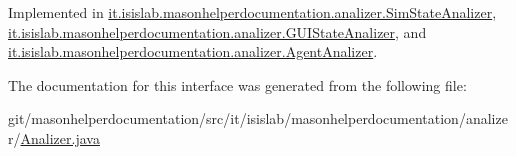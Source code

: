 Implemented in \hyperlink{classit_1_1isislab_1_1masonhelperdocumentation_1_1analizer_1_1_sim_state_analizer_aa91938db714ec7b05134139ce741e61d}{it.\-isislab.\-masonhelperdocumentation.\-analizer.\-Sim\-State\-Analizer}, \hyperlink{classit_1_1isislab_1_1masonhelperdocumentation_1_1analizer_1_1_g_u_i_state_analizer_ade3afe629883da877a73f0a2527c4826}{it.\-isislab.\-masonhelperdocumentation.\-analizer.\-G\-U\-I\-State\-Analizer}, and \hyperlink{classit_1_1isislab_1_1masonhelperdocumentation_1_1analizer_1_1_agent_analizer_aa330ee12112641e1ba3d9acedb9401b9}{it.\-isislab.\-masonhelperdocumentation.\-analizer.\-Agent\-Analizer}.



The documentation for this interface was generated from the following file\-:\begin{DoxyCompactItemize}
\item 
git/masonhelperdocumentation/src/it/isislab/masonhelperdocumentation/analizer/\hyperlink{_analizer_8java}{Analizer.\-java}\end{DoxyCompactItemize}
